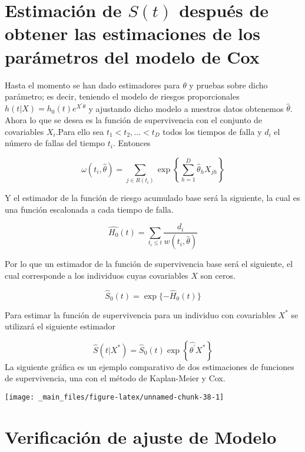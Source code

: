 \documentclass[
  a4paper,
  oneside,
  openany]{book}
\begin{document}
\hypertarget{estimaciuxf3n-de-st-despuuxe9s-de-obtener-las-estimaciones-de-los-paruxe1metros-del-modelo-de-cox}{%
\section{\texorpdfstring{Estimación de \(S(t)\) después de obtener las estimaciones de los parámetros del modelo de Cox}{Estimación de S(t) después de obtener las estimaciones de los parámetros del modelo de Cox}}\label{estimaciuxf3n-de-st-despuuxe9s-de-obtener-las-estimaciones-de-los-paruxe1metros-del-modelo-de-cox}}

Hasta el momento se han dado estimadores para \(\theta\) y pruebas sobre dicho parámetro; es decir, teniendo el modelo de riesgos proporcionales \(h(t|X) = h_0(t)e^{X^{'}\theta}\) y ajustando dicho modelo a nuestros datos obtenemos \(\hat{\theta}\). Ahora lo que se desea es la función de supervivencia con el conjunto de covariables \(X_i\).Para ello sea \(t_1<t_2, \dots<t_D\) todos los tiempos de falla y \(d_i\) el número de fallas del tiempo \(t_i\). Entonces

\[
\omega(t_i, \hat{\theta}) = \sum_{j\in R(t_i)}\exp\left\{\sum_{h=1}^D\hat{\theta}_hX_{jh}\right\}
\]

Y el estimador de la función de riesgo acumulado base será la siguiente, la cual es una función escalonada a cada tiempo de falla.

\[
\hat{H_0}(t) = \sum_{t_i\leq t}\frac{d_i}{w(t_i, \hat{\theta})}
\]

Por lo que un estimador de la función de supervivencia base será el siguiente, el cual corresponde a los individuos cuyas covariables \(X\) son ceros.

\[
\hat{S}_0(t) = \exp\{-\hat{H}_0(t)\}
\]

Para estimar la función de supervivencia para un individuo con covariables \(X^{*}\) se utilizará el siguiente estimador

\[
\hat{S}(t|X^{*})=\hat{S}_0(t)\exp\left\{\hat{\theta^{'}}X^{*}\right\}
\]
La siguiente gráfica es un ejemplo comparativo de dos estimaciones de funciones de supervivencia, una con el método de Kaplan-Meier y Cox.

\begin{center}\texttt{[image: \_main\_files/figure-latex/unnamed-chunk-38-1]} \end{center}

\hypertarget{verificaciuxf3n-de-ajuste-de-modelo}{%
\section{Verificación de ajuste de Modelo}\label{verificaciuxf3n-de-ajuste-de-modelo}}
\end{document}
